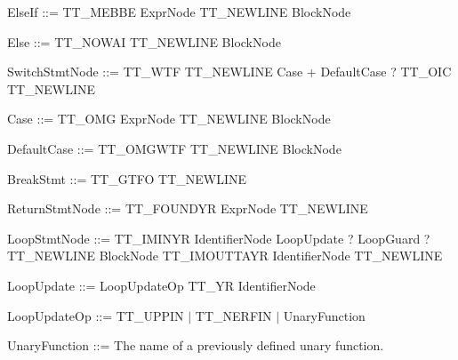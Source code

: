 \begin{DoxyParagraph}{}
Else\+If \+:\+:= {\ttfamily T\+T\+\_\+\+M\+E\+B\+BE} Expr\+Node {\ttfamily T\+T\+\_\+\+N\+E\+W\+L\+I\+NE} Block\+Node
\end{DoxyParagraph}
\begin{DoxyParagraph}{}
Else \+:\+:= {\ttfamily T\+T\+\_\+\+N\+O\+W\+AI} {\ttfamily T\+T\+\_\+\+N\+E\+W\+L\+I\+NE} Block\+Node
\end{DoxyParagraph}
\begin{DoxyParagraph}{}
Switch\+Stmt\+Node \+:\+:= {\ttfamily T\+T\+\_\+\+W\+TF} {\ttfamily T\+T\+\_\+\+N\+E\+W\+L\+I\+NE} Case + Default\+Case ? {\ttfamily T\+T\+\_\+\+O\+IC} {\ttfamily T\+T\+\_\+\+N\+E\+W\+L\+I\+NE} 
\end{DoxyParagraph}
\begin{DoxyParagraph}{}
Case \+:\+:= {\ttfamily T\+T\+\_\+\+O\+MG} Expr\+Node {\ttfamily T\+T\+\_\+\+N\+E\+W\+L\+I\+NE} Block\+Node
\end{DoxyParagraph}
\begin{DoxyParagraph}{}
Default\+Case \+:\+:= {\ttfamily T\+T\+\_\+\+O\+M\+G\+W\+TF} {\ttfamily T\+T\+\_\+\+N\+E\+W\+L\+I\+NE} Block\+Node
\end{DoxyParagraph}
\begin{DoxyParagraph}{}
Break\+Stmt \+:\+:= {\ttfamily T\+T\+\_\+\+G\+T\+FO} {\ttfamily T\+T\+\_\+\+N\+E\+W\+L\+I\+NE} 
\end{DoxyParagraph}
\begin{DoxyParagraph}{}
Return\+Stmt\+Node \+:\+:= {\ttfamily T\+T\+\_\+\+F\+O\+U\+N\+D\+YR} Expr\+Node {\ttfamily T\+T\+\_\+\+N\+E\+W\+L\+I\+NE} 
\end{DoxyParagraph}
\begin{DoxyParagraph}{}
Loop\+Stmt\+Node \+:\+:= {\ttfamily T\+T\+\_\+\+I\+M\+I\+N\+YR} Identifier\+Node Loop\+Update ? Loop\+Guard ? {\ttfamily T\+T\+\_\+\+N\+E\+W\+L\+I\+NE} Block\+Node {\ttfamily T\+T\+\_\+\+I\+M\+O\+U\+T\+T\+A\+YR} Identifier\+Node {\ttfamily T\+T\+\_\+\+N\+E\+W\+L\+I\+NE} 
\end{DoxyParagraph}
\begin{DoxyParagraph}{}
Loop\+Update \+:\+:= Loop\+Update\+Op {\ttfamily T\+T\+\_\+\+YR} Identifier\+Node
\end{DoxyParagraph}
\begin{DoxyParagraph}{}
Loop\+Update\+Op \+:\+:= {\ttfamily T\+T\+\_\+\+U\+P\+P\+IN} $\vert$ {\ttfamily T\+T\+\_\+\+N\+E\+R\+F\+IN} $\vert$ Unary\+Function
\end{DoxyParagraph}
\begin{DoxyParagraph}{}
Unary\+Function \+:\+:= The name of a previously defined unary function.
\end{DoxyParagraph}
